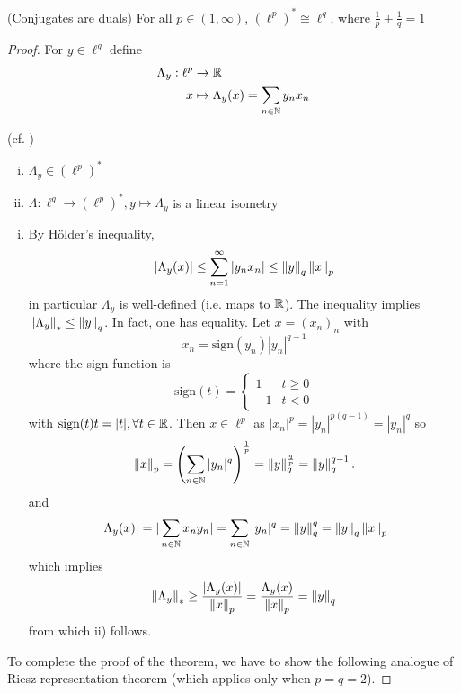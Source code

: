 \documentclass{article}
\begin{document}
\begin{theorem}
    (Conjugates are duals) For all $p \in (1, \infty)$, $(\ell^p)^* \cong \ell^q$, where $\frac{1}{p}+\frac{1}{q}=1$
\end{theorem}  

\begin{proof}
    For $y \in \ell^q$ define  
    \begin{align*}
        \Lambda_y: \ell^p &\to \mathbb{R} \\
        x &\mapsto \Lambda_y(x) = \sum_{n \in \mathbb{N}} y_n x_n
    \end{align*}
\begin{lemma} (cf. )
\label{isometry in lp dual}
\begin{enumerate}[i)]
    \item $\Lambda_y \in (\ell^p)^*$
    \item $\Lambda: \ell^q \to (\ell^p)^*, y \mapsto \Lambda_y$ is a linear isometry
\end{enumerate}  
\end{lemma}
\begin{enumerate}[i)]
    \item By Hölder's inequality,  
    	\begin{equation*}
		\left|\Lambda_y(x)\right|
		\leq\sum_{n=1}^{\infty}|y_n x_n|
		\leq\left\|{y}\right\|_q\left\|{x}\right\|_p
	\end{equation*}
	in particular $\Lambda_y$ is well-defined (i.e. maps to $\mathbb{R}$). The inequality implies $\left\|{\Lambda_y}\right\|_* \leq \left\|{y}\right\|_q$.   
	In fact, one has equality. Let $x=(x_n)_n$ with  
	$$x_n = \textrm{sign}(y_n) |y_n|^{q-1}$$
	where the sign function is  
	\begin{equation*}
	    \textrm{sign}(t) = \begin{cases}
	    1 & t \geq 0 \\
	    -1 & t<0
	\end{cases}
	\end{equation*}
	with $\textrm{sign}(t)t=|t|, \forall t \in \mathbb{R}$.  
	Then $x \in \ell^p$ as $|x_n|^p=|y_n|^{p(q-1)}=|y_n|^q$ so  
	$$
	\left\|{x}\right\|_p = \left(\sum_{n \in \mathbb{N}} |y_n|^q\right)^{\frac{1}{p}} = \left\|{y}\right\|_q^{\frac{q}{p}} = \left\|{y}\right\|_q^{q-1}. 
	$$
	and
	$$
	|\Lambda_y(x)| = |\sum_{n \in \mathbb{N}} x_ny_n| = \sum_{n \in \mathbb{N}} |y_n|^q = \left\|{y}\right\|^q_q =\left\|{y}\right\|_q\left\|{x}\right\|_p 
	$$
	which implies  
	$$
        \left\|{\Lambda_y}\right\|_* \geq \frac{|\Lambda_y(x)|}{\left\|{x}\right\|_p} = \frac{\Lambda_y(x)}{\left\|{x}\right\|_p} = \left\|{y}\right\|_q
	$$
        from which ii) follows.
\end{enumerate}
To complete the proof of the theorem, we have to show the following analogue of Riesz representation theorem (which applies only when $p=q=2$).  


\end{proof}
\end{document}
